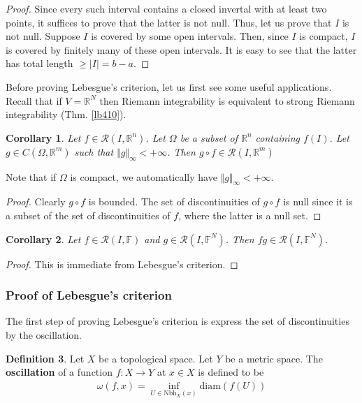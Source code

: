 \documentclass[12pt,b5paper,notitlepage]{article}
\theoremstyle{definition}
\newtheorem{df}{Definition}[section]
\theoremstyle{plain}
\newtheorem{co}[df]{Corollary}
\newcommand{\scr}{\mathscr}
\newcommand{\Rbb}{\mathbb R}
\newcommand{\Fbb}{\mathbb F}
\newcommand{\Nbh}{\mathrm{Nbh}}
\newcommand{\diam}{\mathrm{diam}}
\numberwithin{equation}{section}
\begin{document}
\begin{proof}
Since every such interval contains a closed invertal with at least two points, it suffices to prove that the latter is not null. Thus, let us prove that $I$ is not null. Suppose $I$ is covered by some open intervals. Then, since $I$ is compact, $I$ is covered by finitely many of these open intervals. It is easy to see that the latter has total length $\geq|I|= b-a$.
\end{proof}



Before proving Lebesgue's criterion, let us first see some useful applications. Recall that if $V=\Rbb^N$ then Riemann integrability is equivalent to strong Riemann integrability (Thm. \ref{lb410}).

\begin{co}
Let $f\in\scr R(I,\Rbb^n)$. Let $\Omega$ be a subset of $\Rbb^n$ containing $f(I)$. Let $g\in C(\Omega,\Rbb^m)$ such that $\Vert g\Vert_\infty<+\infty$. Then $g\circ f\in\scr R(I,\Rbb^m)$
\end{co}

Note that if $\Omega$ is compact, we automatically have $\Vert g\Vert_\infty<+\infty$.

\begin{proof}
Clearly $g\circ f$ is bounded. The set of discontinuities of $g\circ f$ is null since it is a subset of the set of discontinuities of $f$, where the latter is a null set.
\end{proof}


\begin{co}
Let $f\in\scr R(I,\Fbb)$ and $g\in\scr R(I,\Fbb^N)$. Then $fg\in\scr R(I,\Fbb^N)$.
\end{co}

\begin{proof}
This is immediate from Lebesgue's criterion.
\end{proof}


\subsubsection{Proof of Lebesgue's criterion}


The first step of proving Lebesgue's criterion is express the set of discontinuities by the oscillation.

\begin{df}
Let $X$ be a topological space. Let $Y$ be a metric space. The \textbf{oscillation}   of a function $f:X\rightarrow Y$ at $x\in X$ is defined to be
\begin{align*}
\omega(f,x)=\inf_{U\in\Nbh_X(x)}\diam(f(U))
\end{align*}
\end{df}
\end{document}

